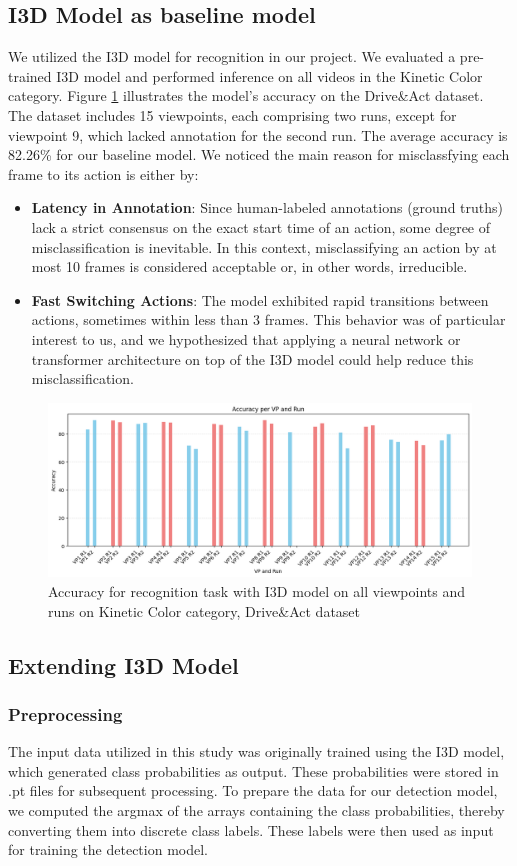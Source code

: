 \documentclass{article}
\begin{document}
\subsection{I3D Model as baseline model}
We utilized the I3D model for recognition in our project. We evaluated a pre-trained I3D model and performed inference on all videos in the Kinetic Color category. Figure \ref{fig:i3d-acc} illustrates the model's accuracy on the Drive\&Act dataset. The dataset includes 15 viewpoints, each comprising two runs, except for viewpoint 9, which lacked annotation for the second run. The average accuracy is 82.26\% for our baseline model.
We noticed the main reason for misclassfying each frame to its action is either by:
\begin{itemize}
    \item \textbf{Latency in Annotation}: Since human-labeled annotations (ground truths) lack a strict consensus on the exact start time of an action, some degree of misclassification is inevitable. In this context, misclassifying an action by at most 10 frames is considered acceptable or, in other words, irreducible.
    \item \textbf{Fast Switching Actions}: The model exhibited rapid transitions between actions, sometimes within less than 3 frames. This behavior was of particular interest to us, and we hypothesized that applying a neural network or transformer architecture on top of the I3D model could help reduce this misclassification.
\end{itemize}
\begin{figure}[ht]
    \centering
    \includegraphics[width=0.9\linewidth]{figs/i3d-acc.png}
    \caption{Accuracy for recognition task with I3D model on all viewpoints and runs on Kinetic Color category, Drive\&Act dataset}
    \label{fig:i3d-acc}
\end{figure}
\subsection{Extending I3D Model}
\subsubsection{Preprocessing}
The input data utilized in this study was originally trained using the I3D model, which generated class probabilities as output. These probabilities were stored in .pt files for subsequent processing. To prepare the data for our detection model, we computed the argmax of the arrays containing the class probabilities, thereby converting them into discrete class labels. These labels were then used as input for training the detection model.
\end{document}
